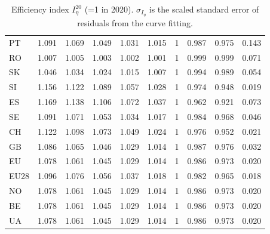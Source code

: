 \documentclass[12pt]{article}
\begin{document}
\begin{table}[h!]
\begin{tabular}{l|lllllllll}
PT      & 1.091 & 1.069 & 1.049 & 1.031 & 1.015 & 1    & 0.987 & 0.975 & 0.143       \\
RO      & 1.007 & 1.005 & 1.003 & 1.002 & 1.001 & 1    & 0.999 & 0.999 & 0.071       \\
SK      & 1.046 & 1.034 & 1.024 & 1.015 & 1.007 & 1    & 0.994 & 0.989 & 0.054       \\
SI      & 1.156 & 1.122 & 1.089 & 1.057 & 1.028 & 1    & 0.974 & 0.948 & 0.019       \\
ES      & 1.169 & 1.138 & 1.106 & 1.072 & 1.037 & 1    & 0.962 & 0.921 & 0.073       \\
SE      & 1.091 & 1.071 & 1.053 & 1.034 & 1.017 & 1    & 0.984 & 0.968 & 0.046       \\
CH      & 1.122 & 1.098 & 1.073 & 1.049 & 1.024 & 1    & 0.976 & 0.952 & 0.021       \\
GB      & 1.086 & 1.065 & 1.046 & 1.029 & 1.014 & 1    & 0.987 & 0.976 & 0.032       \\
EU      & 1.078 & 1.061 & 1.045 & 1.029 & 1.014 & 1    & 0.986 & 0.973 & 0.020       \\
EU28    & 1.096 & 1.076 & 1.056 & 1.037 & 1.018 & 1    & 0.982 & 0.965 & 0.018       \\
NO      & 1.078 & 1.061 & 1.045 & 1.029 & 1.014 & 1    & 0.986 & 0.973 & 0.020       \\
BE      & 1.078 & 1.061 & 1.045 & 1.029 & 1.014 & 1    & 0.986 & 0.973 & 0.020       \\
UA      & 1.078 & 1.061 & 1.045 & 1.029 & 1.014 & 1    & 0.986 & 0.973 & 0.020      
\end{tabular}
\caption{Efficiency index $I_\eta^{20}$ (=1 in 2020). $\sigma_{I_\eta}$ is the scaled standard error of residuals from the curve fitting. } \label{table:efficiency_index}
\end{table}
\end{document}
